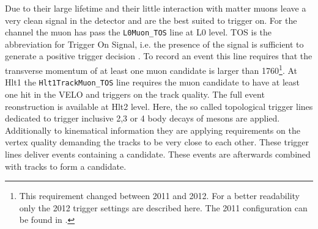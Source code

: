 Due to their large lifetime and their little interaction with matter muons leave a very clean signal in the detector and are the best suited to trigger on. For the \LbToDpmunuX channel the muon has pass the \texttt{L0Muon\_TOS} line at L0 level. TOS is the abbreviation for Trigger On Signal, i.e. the presence of the signal is sufficient to generate a positive trigger decision \cite{Tolk:1701134}. 
To record an event this line requires that the transverse momentum of at least one muon candidate is larger than 1760\mev\footnote{This requirement changed between 2011 and 2012. For a better readability only the 2012 trigger settings are described here. The 2011 configuration can be found in \cite{Trigger_2011_2012}.}.
At Hlt1 the \texttt{Hlt1TrackMuon\_TOS} line requires the muon candidate to have at least one hit in the VELO and triggers on the track quality.
The full event reonstruction is available at Hlt2 level.
Here, the so called topological trigger lines dedicated to trigger inclusive 2,3 or 4 body decays of \B mesons are applied.
Additionally to kinematical information they are applying requirements on the vertex quality demanding the tracks to be very close to each other.
These trigger lines deliver events containing a \Dz\mun candidate.
These events are afterwards combined with \proton tracks to form a \LbToDpmunuX candidate.


